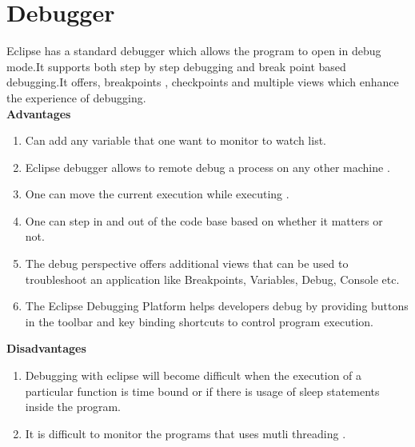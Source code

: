 \documentclass[letterpaper, 11pt]{report}
\begin{document}
\section*{Debugger}
Eclipse has a standard debugger which allows the program to open in debug mode.It supports both step by step debugging and break point based debugging.It offers, breakpoints , checkpoints and multiple views which enhance the experience of debugging.\\

\textbf{Advantages}

\begin{enumerate}
  \item Can add any variable that one want to monitor to watch list.\
  \item Eclipse debugger allows to remote debug a process on any other machine .\
  \item One can move the current execution while executing . \
  \item One can step in and out of the code base based on whether it matters or not.\
  \item The debug perspective offers additional views that can be used to troubleshoot an application like Breakpoints, Variables, Debug, Console etc. \
  \item The Eclipse Debugging Platform helps developers debug by providing buttons in the toolbar and key binding shortcuts to control program execution. \
\end{enumerate}

\textbf{Disadvantages}
\begin{enumerate}
\item Debugging with eclipse will become difficult when the execution  of a particular function is time bound or if there is usage of sleep statements inside the program. \
\item It is difficult to monitor the programs that uses mutli threading . \
\end{enumerate}
\newpage
\end{document}
